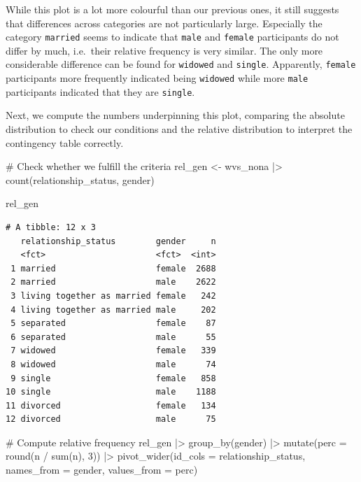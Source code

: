 \documentclass[
  letterpaper,
  DIV=11,
  numbers=noendperiod]{scrreprt}
\newenvironment{Shaded}{\begin{snugshade}}{\end{snugshade}}
\newcommand{\AttributeTok}[1]{\textcolor[rgb]{0.40,0.45,0.13}{#1}}
\newcommand{\CommentTok}[1]{\textcolor[rgb]{0.37,0.37,0.37}{#1}}
\newcommand{\DecValTok}[1]{\textcolor[rgb]{0.68,0.00,0.00}{#1}}
\newcommand{\FunctionTok}[1]{\textcolor[rgb]{0.28,0.35,0.67}{#1}}
\newcommand{\NormalTok}[1]{\textcolor[rgb]{0.00,0.23,0.31}{#1}}
\newcommand{\OtherTok}[1]{\textcolor[rgb]{0.00,0.23,0.31}{#1}}
\newcommand{\SpecialCharTok}[1]{\textcolor[rgb]{0.37,0.37,0.37}{#1}}
\begin{document}
While this plot is a lot more colourful than our previous ones, it still
suggests that differences across categories are not particularly large.
Especially the category \texttt{married} seems to indicate that
\texttt{male} and \texttt{female} participants do not differ by much,
i.e.~their relative frequency is very similar. The only more
considerable difference can be found for \texttt{widowed} and
\texttt{single}. Apparently, \texttt{female} participants more
frequently indicated being \texttt{widowed} while more \texttt{male}
participants indicated that they are \texttt{single}.

Next, we compute the numbers underpinning this plot, comparing the
absolute distribution to check our conditions and the relative
distribution to interpret the contingency table correctly.

\begin{Shaded}
\begin{Highlighting}[]
\CommentTok{\# Check whether we fulfill the criteria}
\NormalTok{rel\_gen }\OtherTok{\textless{}{-}}
\NormalTok{  wvs\_nona }\SpecialCharTok{|\textgreater{}}
  \FunctionTok{count}\NormalTok{(relationship\_status, gender)}

\NormalTok{rel\_gen}
\end{Highlighting}
\end{Shaded}

\begin{verbatim}
# A tibble: 12 x 3
   relationship_status        gender     n
   <fct>                      <fct>  <int>
 1 married                    female  2688
 2 married                    male    2622
 3 living together as married female   242
 4 living together as married male     202
 5 separated                  female    87
 6 separated                  male      55
 7 widowed                    female   339
 8 widowed                    male      74
 9 single                     female   858
10 single                     male    1188
11 divorced                   female   134
12 divorced                   male      75
\end{verbatim}

\begin{Shaded}
\begin{Highlighting}[]
\CommentTok{\# Compute relative frequency}
\NormalTok{rel\_gen }\SpecialCharTok{|\textgreater{}}
  \FunctionTok{group\_by}\NormalTok{(gender) }\SpecialCharTok{|\textgreater{}}
  \FunctionTok{mutate}\NormalTok{(}\AttributeTok{perc =} \FunctionTok{round}\NormalTok{(n }\SpecialCharTok{/} \FunctionTok{sum}\NormalTok{(n), }\DecValTok{3}\NormalTok{)) }\SpecialCharTok{|\textgreater{}}
  \FunctionTok{pivot\_wider}\NormalTok{(}\AttributeTok{id\_cols =}\NormalTok{ relationship\_status,}
              \AttributeTok{names\_from =}\NormalTok{ gender,}
              \AttributeTok{values\_from =}\NormalTok{ perc)}
\end{Highlighting}
\end{Shaded}
\end{document}
